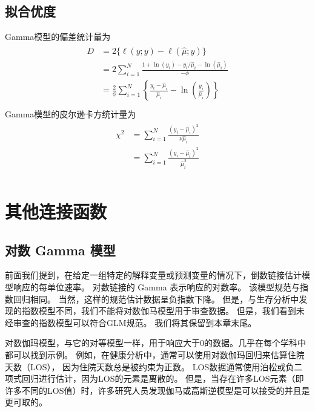 \documentclass[letterpaper,10pt,english]{sphinxmanual}
\begin{document}
\subsection{拟合优度}
\label{\detokenize{gamma_u6a21_u578b/content:id6}}
Gamma模型的偏差统计量为
\begin{align}\label{equation:gamma模型/content:gamma模型/content:16}\!\begin{aligned}
D &= 2 \{ \ell(y;y)  - \ell(\hat{\mu};y)\}\\
&= 2 \sum_{i=1}^N \frac{1+\ln(y_i)-y_i/\hat{\mu}_i-\ln(\hat{\mu}_i)  }{-\phi}\\
&=   \frac{2}{\phi} \sum_{i=1}^N
 \left \{ \frac{y_i - \hat{\mu}_i}{\hat{\mu}_i} - \ln \left (  \frac{y_i}{\hat{\mu}_i} \right ) \right \}\\
\end{aligned}\end{align}
Gamma模型的皮尔逊卡方统计量为
\begin{align}\label{equation:gamma模型/content:gamma模型/content:17}\!\begin{aligned}
\chi^2
&= \sum_{i=1}^N \frac{ (y_i-\hat{\mu}_i)^2}{\nu{\hat{\mu}_i}}\\
&= \sum_{i=1}^N \frac{ (y_i-\hat{\mu}_i)^2}{\hat{\mu}_i^2}\\
\end{aligned}\end{align}

\section{其他连接函数}
\label{\detokenize{gamma_u6a21_u578b/content:id7}}

\subsection{对数 Gamma 模型}
\label{\detokenize{gamma_u6a21_u578b/content:id8}}
前面我们提到，在给定一组特定的解释变量或预测变量的情况下，倒数链接估计模型响应的每单位速率。
对数链接的 Gamma 表示响应的对数率。
该模型规范与指数回归相同。
当然，这样的规范估计数据呈负指数下降。
但是，与生存分析中发现的指数模型不同，我们不能将对数伽马模型用于审查数据。
但是，我们看到未经审查的指数模型可以符合GLM规范。 我们将其保留到本章末尾。

对数伽玛模型，与它的对等模型一样，用于响应大于0的数据。几乎在每个学科中都可以找到示例。 例如，在健康分析中，通常可以使用对数伽玛回归来估算住院天数（LOS），
因为住院天数总是被约束为正数。
LOS数据通常使用泊松或负二项式回归进行估计，因为LOS的元素是离散的。
但是，当存在许多LOS元素（即许多不同的LOS值）时，许多研究人员发现伽马或高斯逆模型是可以接受的并且是更可取的。
\end{document}
